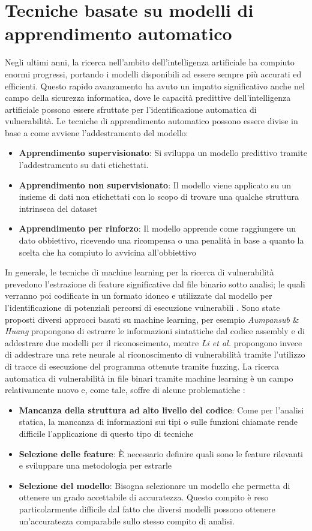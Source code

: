 \documentclass[../main.tex]{subfiles}
\begin{document}
\section{Tecniche basate su modelli di apprendimento automatico}
Negli ultimi anni, la ricerca nell'ambito dell'intelligenza artificiale ha compiuto enormi progressi, portando i modelli disponibili ad essere
sempre più accurati ed efficienti. Questo rapido avanzamento ha avuto un impatto significativo anche nel campo della sicurezza informatica, dove
le capacità predittive dell'intelligenza artificiale possono essere sfruttate per l'identificazione automatica di vulnerabilità.
Le tecniche di apprendimento automatico possono essere divise in base a come avviene l'addestramento del modello:
\begin{itemize}
    \item \textbf{Apprendimento supervisionato}: Si sviluppa un modello predittivo tramite l'addestramento su dati etichettati.
    \item \textbf{Apprendimento non supervisionato}: Il modello viene applicato su un insieme di dati non etichettati con lo scopo di trovare una qualche struttura intrinseca del dataset
    \item \textbf{Apprendimento per rinforzo}: Il modello apprende come raggiungere un dato obbiettivo, ricevendo una ricompensa o una penalità in base a quanto la scelta che ha compiuto lo avvicina all'obbiettivo
\end{itemize}
In generale, le tecniche di machine learning per la ricerca di vulnerabilità prevedono l'estrazione di feature significative dal file binario sotto analisi; le quali verranno poi codificate in un formato idoneo e utilizzate
dal modello per l'identificazione di potenziali percorsi di esecuzione vulnerabili \cite{ML_Survey}.
Sono state proposti diversi approcci basati su machine learning, per esempio \textit{Aumpansub} \& \textit{Huang} \cite{ML1} propongono di estrarre le informazioni sintattiche dal codice assembly e di addestrare
due modelli per il riconoscimento, mentre \textit{Li et al.} \cite{DeepVL} propongono invece di addestrare una rete neurale al riconoscimento di vulnerabilità tramite l'utilizzo di tracce di esecuzione del programma ottenute tramite fuzzing.
La ricerca automatica di vulnerabilità in file binari tramite machine learning è un campo relativamente nuovo e, come tale, soffre di alcune problematiche \cite{ML2}:
\begin{itemize}
    \item \textbf{Mancanza della struttura ad alto livello del codice}: Come per l'analisi statica, la mancanza di informazioni sui tipi o sulle funzioni chiamate rende difficile l'applicazione di questo tipo di tecniche
    \item \textbf{Selezione delle feature}: È necessario definire quali sono le feature rilevanti e sviluppare una metodologia per estrarle
    \item \textbf{Selezione del modello}: Bisogna selezionare un modello che permetta di ottenere un grado accettabile di accuratezza. Questo compito è reso particolarmente difficile dal fatto che diversi modelli possono ottenere un'accuratezza comparabile sullo stesso compito di analisi.  
\end{itemize}
\end{document}
